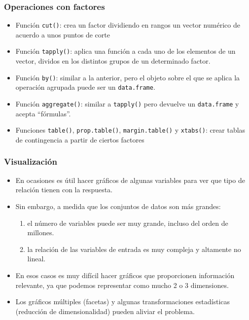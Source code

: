\documentclass{beamer}
\begin{document}
\begin{frame}
  \frametitle{Operaciones con factores}
  \begin{itemize}
    \item Función \texttt{cut()}: crea un factor dividiendo en rangos un vector numérico de acuerdo a unos puntos de corte
    \item Función \texttt{tapply()}: aplica una función a cada uno de los elementos de un vector, dividos en los distintos grupos de un determinado factor.
    \item Función \texttt{by()}: similar a la anterior, pero el objeto sobre el que se aplica la operación agrupada puede ser un \texttt{data.frame}.
    \item Función \texttt{aggregate()}: similar a \texttt{tapply()} pero devuelve un \texttt{data.frame} y acepta ``fórmulas''.
    \item Funciones \texttt{table()}, \texttt{prop.table()}, \texttt{margin.table()} y \texttt{xtabs()}: crear tablas de contingencia a partir de ciertos factores
  \end{itemize}
\end{frame}


\begin{frame}
\frametitle{Visualización}

\begin{itemize}
\item En ocasiones es útil hacer gráficos de algunas variables para ver que tipo de relación tienen con la respuesta.
\item Sin embargo, a medida que los conjuntos de datos son más grandes:
\begin{enumerate}
\item el número de variables puede ser muy grande, incluso del orden de millones.
\item la relación de las variables de entrada es muy compleja y altamente no lineal.
\end{enumerate}
\item En esos casos es muy difícil hacer gráficos que proporcionen información relevante, ya que podemos representar como mucho 2 o 3 dimensiones.
\item Los gráficos múltiples (facetas) y algunas transformaciones estadísticas (reducción de dimensionalidad) pueden aliviar el problema.
\end{itemize}
\end{frame}
\end{document}
